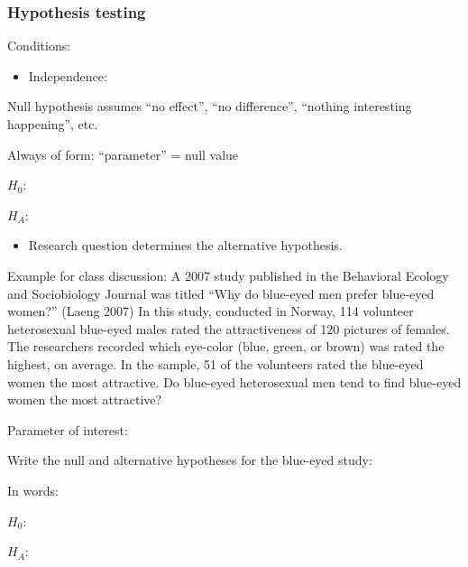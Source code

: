 \documentclass[
]{report}
\providecommand{\tightlist}{%
  \setlength{\itemsep}{0pt}\setlength{\parskip}{0pt}}
\newcommand{\rgi}{\hspace{24pt}}  %
\begin{document}
\hypertarget{hypothesis-testing-1}{%
\subsubsection*{Hypothesis testing}\label{hypothesis-testing-1}}

Conditions:

\begin{itemize}
\tightlist
\item
  Independence:
\end{itemize}

\vspace{0.3in}

Null hypothesis assumes ``no effect'', ``no difference'', ``nothing interesting happening'', etc.

\rgi Always of form: ``parameter'' = null value

\(H_0:\)

\vspace{0.5in}

\(H_A:\)

\vspace{0.5in}

\begin{itemize}
\tightlist
\item
  Research question determines the alternative hypothesis.
\end{itemize}

Example for class discussion: A 2007 study published in the Behavioral Ecology and Sociobiology Journal was titled ``Why do blue-eyed men prefer blue-eyed women?'' (Laeng 2007) In this study, conducted in Norway, 114 volunteer heterosexual blue-eyed males rated the attractiveness of 120 pictures of females. The researchers recorded which eye-color (blue, green, or brown) was rated the highest, on average. In the sample, 51 of the volunteers rated the blue-eyed women the most attractive. Do blue-eyed heterosexual men tend to find blue-eyed women the most attractive?

Parameter of interest:

\vspace{0.4in}

Write the null and alternative hypotheses for the blue-eyed study:

In words:

\(H_0:\)

\vspace{0.45in}

\(H_A:\)
\end{document}
